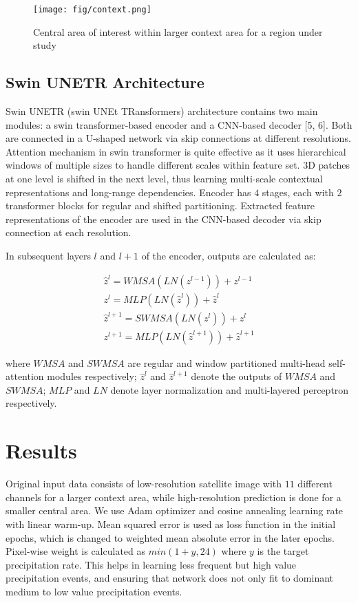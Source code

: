 \documentclass{article}
\begin{document}
\begin{figure}
  \centering
  \texttt{[image: fig/context.png]}
  \caption{Central area of interest within larger context area for a region under study}
  \label{context}
\end{figure}

\subsection{Swin UNETR Architecture}

Swin UNETR (swin UNEt TRansformers) architecture contains two main modules: a swin transformer-based encoder and a CNN-based decoder [5, 6]. Both are connected in a U-shaped network via skip connections at different resolutions. Attention mechanism in swin transformer is quite effective as it uses hierarchical windows of multiple sizes to handle different scales within feature set. 3D patches at one level is shifted in the next level, thus learning multi-scale contextual representations and long-range dependencies. Encoder has $4$ stages, each with $2$ transformer blocks for regular and shifted partitioning. Extracted feature representations of the encoder are used in the CNN-based decoder via skip connection at each resolution.

In subsequent layers $l$ and $l+1$ of the encoder, outputs are calculated as:

\begin{equation} 
\begin{split} 
\hat{z}^l = WMSA(LN(z^{l-1})) + z^{l-1} \\
z^l = MLP(LN(\hat{z}^l)) + \hat{z}^l \\
\hat{z}^{l+1} = SWMSA(LN(z^{l})) + z^{l} \\
z^{l+1} = MLP(LN(\hat{z}^{l+1})) + \hat{z}^{l+1}
\end{split} 
\end{equation} 

where $WMSA$ and $SWMSA$ are regular and window partitioned multi-head self-attention modules respectively; $\hat{z}^l$ and $\hat{z}^{l+1}$ denote the outputs of $WMSA$ and $SWMSA$; $MLP$ and $LN$ denote layer normalization and multi-layered perceptron respectively.

\section{Results}

Original input data consists of low-resolution satellite image with $11$ different channels for a larger context area, while high-resolution prediction is done for a smaller central area. We use Adam optimizer and cosine annealing learning rate with linear warm-up. Mean squared error is used as loss function in the initial epochs, which is changed to weighted mean absolute error in the later epochs. Pixel-wise weight is calculated as $min(1+y, 24)$ where $y$ is the target precipitation rate. This helps in learning less frequent but high value precipitation events, and ensuring that network does not only fit to dominant medium to low value precipitation events.
\end{document}
